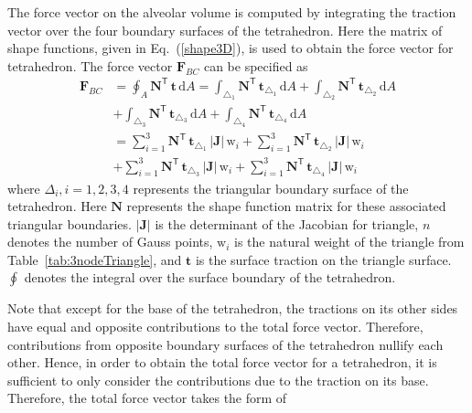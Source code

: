 The force vector on the alveolar volume is computed by integrating the traction vector over the four boundary surfaces of the tetrahedron. Here the matrix of shape functions, given in Eq.~(\ref{shape3D}), is used to obtain the force vector for tetrahedron. The force vector $\mathbf{F}_{BC}$ can be specified as
\begin{equation}
\begin{aligned}
\mathbf{F}_{BC} &= \oint_{A} \mathbf{N}^{\mathsf{T}} \, \mathbf{t} \, \mathrm{d} A = \int_{\triangle_{1}} \mathbf{N}^{\mathsf{T}} \, \mathbf{t}_{\triangle_{1}} \, \mathrm{d} A  + \int_{\triangle_{2}}  \mathbf{N}^{\mathsf{T}} \, \mathbf{t}_{\triangle_{2}}  \, \mathrm{d} A \\
& + \int_{\triangle_{3}} \mathbf{N}^{\mathsf{T}} \, \mathbf{t}_{\triangle_{3}} \, \mathrm{d} A + \int_{\triangle_{4}} \mathbf{N}^{\mathsf{T}} \, \mathbf{t}_{\triangle_{4}} \, \mathrm{d} A \\
& = \sum_{i=1}^{3} \mathbf{N}^{\mathsf{T}} \, \mathbf{t}_{\triangle_{1}} \,|\mathbf{J}| \, \mathrm{w}_i  + \sum_{i=1}^{3}  \mathbf{N}^{\mathsf{T}} \, \mathbf{t}_{\triangle_{2}} \,|\mathbf{J}| \, \mathrm{w}_i  \\
& + \sum_{i=1}^{3} \mathbf{N}^{\mathsf{T}} \, \mathbf{t}_{\triangle_{3}} \,|\mathbf{J}| \, \mathrm{w}_i  + \sum_{i=1}^{3}  \mathbf{N}^{\mathsf{T}} \, \mathbf{t}_{\triangle_{4}} \,|\mathbf{J}| \, \mathrm{w}_i 
\end{aligned}
\end{equation}
where $\Delta_i, i=1, 2, 3, 4$ represents the triangular boundary surface of the tetrahedron. Here $ \mathbf{N}$ represents the shape function matrix for these associated triangular boundaries.   $|\mathbf{J}|$ is the determinant of the Jacobian for triangle, $n$ denotes the number of Gauss points, $\mathrm{w}_i$ is the natural weight of the triangle from Table~\ref{tab:3nodeTriangle}, and $\mathbf{t}$ is the surface traction on the triangle surface. $\oint$ denotes the integral over the surface boundary of the tetrahedron.

Note that except for the base of the tetrahedron, the tractions on its other sides have equal and opposite contributions to the total force vector. Therefore, contributions from opposite boundary surfaces of the tetrahedron nullify each other. Hence, in order to obtain the total force vector for a tetrahedron, it is sufficient to only consider the contributions due to the traction on its base. Therefore, the total force vector takes the form of

